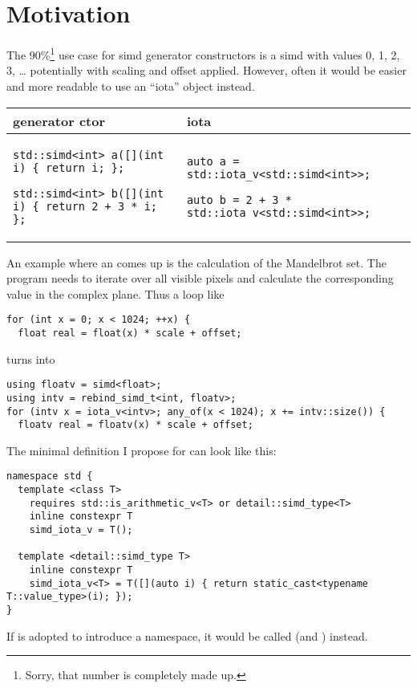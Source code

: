 \section{Motivation}
The 90\%\footnote{Sorry, that number is completely made up.} use case for simd
generator constructors is a simd with values 0, 1, 2, 3, \ldots{} potentially
with scaling and offset applied.
However, often it would be easier and more readable to use an “iota”
 object instead.

\begingroup
  \smaller[1]
\begin{tabular}{p{}|p{}}
  generator ctor & iota \\
  \hline
  \begin{lstlisting}
std::simd<int> a([](int i) { return i; };

std::simd<int> b([](int i) { return 2 + 3 * i; };
  \end{lstlisting}
  &
  \begin{lstlisting}
auto a = std::iota_v<std::simd<int>>;

auto b = 2 + 3 * std::iota_v<std::simd<int>>;
  \end{lstlisting}
\end{tabular}
\endgroup

\pagebreak
An example where an  comes up is the calculation of the
Mandelbrot set.
The program needs to iterate over all visible pixels and calculate the
corresponding value in the complex plane.
Thus a loop like
\medskip\begin{lstlisting}[style=Vc]
for (int x = 0; x < 1024; ++x) {
  float real = float(x) * scale + offset;
\end{lstlisting}
turns into
\medskip\begin{lstlisting}[style=Vc]
using floatv = simd<float>;
using intv = rebind_simd_t<int, floatv>;
for (intv x = iota_v<intv>; any_of(x < 1024); x += intv::size()) {
  floatv real = floatv(x) * scale + offset;
\end{lstlisting}

The minimal definition I propose for \simd can look like this:
\medskip\begin{lstlisting}[style=Vc]
namespace std {
  template <class T>
    requires std::is_arithmetic_v<T> or detail::simd_type<T>
    inline constexpr T
    simd_iota_v = T();

  template <detail::simd_type T>
    inline constexpr T
    simd_iota_v<T> = T([](auto i) { return static_cast<typename T::value_type>(i); });
}
\end{lstlisting}

If \cite{P3287R0} is adopted to introduce a \std{} namespace, it would
be called \std{} (and
\std{}) instead.

